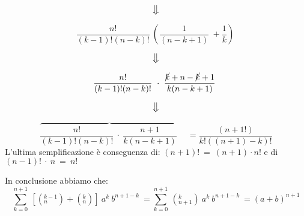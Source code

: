\begin{dimo}
	\begin{equation*}
	\big\Downarrow
	\end{equation*}
	
	\begin{equation} 
	\frac{n!}{(k-1)!(n-k)!}\ \left( \frac{1}{(n-k+1)}\ + \frac{1}{k} \right)\
	\end{equation}

	\begin{equation*}
	\big\Downarrow
	\end{equation*}
	

	\begin{equation}
	\frac{n!}{(k-1)!(n-k)!}\ \cdot\ 
	\frac{\cancel{k} + n - \cancel{k} + 1}{k (n-k+1)}\
	\end{equation}

	\begin{equation*}
	\big\Downarrow
	\end{equation*}
	
	
	\begin{equation}
	\overbrace{
	\frac{n!}{(k-1)!(n-k)!}\ \cdot\
	\frac{n+1}{k(n-k+1)}\ } \quad =
	\frac{(n+1!)}{k!((n+1)-k)!}
	\end{equation}
L'ultima semplificazione è conseguenza di: $(n+1)!\ =\ (n+1) \cdot n!$
e di $(n-1)!\ \cdot \ n\ =\ n!$

In conclusione abbiamo che:
	\begin{equation}
	\sum_{k=0}^{n+1}\ [(_{n}^{k-1}) + (_{n}^{k})]\ a^{k}\ b^{n+1-k}\ =
	\sum_{k=0}^{n+1}\ (_{n+1}^{k})\ a^{k}\ b^{n+1-k}\ =
	(a + b)^{n+1}
	\end{equation}

\end{dimo}
